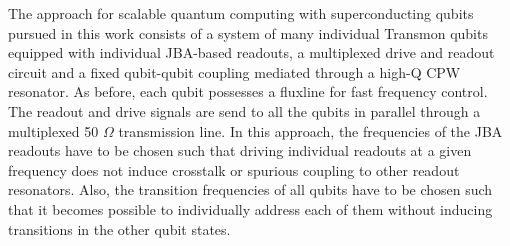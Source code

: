 The approach for scalable quantum computing with superconducting qubits pursued in this work consists of a system of many individual Transmon qubits equipped with individual JBA-based readouts, a multiplexed drive and readout circuit and a fixed qubit-qubit coupling mediated through a high-Q CPW resonator. As before, each qubit possesses a fluxline for fast frequency control. The readout and drive signals are send to all the qubits in parallel through a multiplexed 50 $\Omega$ transmission line. In this approach, the frequencies of the JBA readouts have to be chosen such that driving individual readouts at a given frequency does not induce crosstalk or spurious coupling to other readout resonators. Also, the transition frequencies of all qubits have to be chosen such that it becomes possible to individually address each of them without inducing transitions in the other qubit states.
